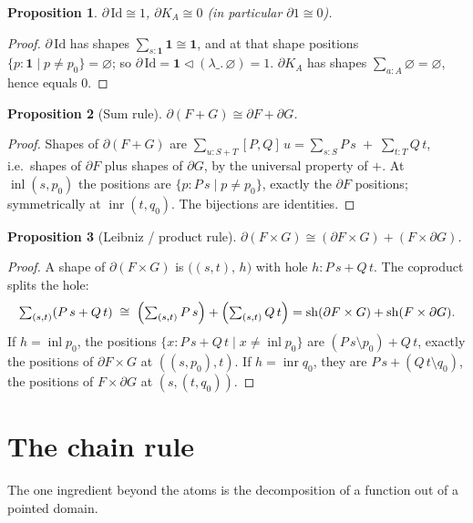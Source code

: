 \documentclass[11pt]{article}
\newtheorem{proposition}{Proposition}
\theoremstyle{definition}
\newcommand{\tri}{\mathbin{\triangleleft}}
\newcommand{\pd}{\partial}
\DeclareMathOperator{\inl}{inl}
\DeclareMathOperator{\inr}{inr}
\begin{document}
\begin{proposition}\label{prop:atoms}
$\pd\,\mathrm{Id} \cong 1$, \quad $\pd K_A \cong 0$ \; (in particular $\pd 1 \cong 0$).
\end{proposition}
\begin{proof}
$\pd\,\mathrm{Id}$ has shapes $\sum_{s:\mathbf 1}\mathbf 1 \cong \mathbf 1$, and at
that shape positions $\{p:\mathbf 1 \mid p\neq p_0\} = \varnothing$; so
$\pd\,\mathrm{Id} = \mathbf 1 \tri (\lambda\_.\,\varnothing) = 1$. $\pd K_A$ has
shapes $\sum_{a:A}\varnothing = \varnothing$, hence equals $0$.
\end{proof}

\begin{proposition}[Sum rule]\label{prop:sum}
$\pd(F + G) \cong \pd F + \pd G$.
\end{proposition}
\begin{proof}
Shapes of $\pd(F+G)$ are $\sum_{u : S+T}[P,Q]\,u = \sum_{s:S}P\,s \;+\; \sum_{t:T}Q\,t$,
i.e.\ shapes of $\pd F$ plus shapes of $\pd G$, by the universal property of $+$.
At $\inl(s,p_0)$ the positions are $\{p : P\,s \mid p\neq p_0\}$, exactly the
$\pd F$ positions; symmetrically at $\inr(t,q_0)$. The bijections are identities.
\end{proof}

\begin{proposition}[Leibniz / product rule]\label{prop:leibniz}
$\pd(F \times G) \cong (\pd F \times G) + (F \times \pd G)$.
\end{proposition}
\begin{proof}
A shape of $\pd(F\times G)$ is $\bigl((s,t),\,h\bigr)$ with hole
$h : P\,s + Q\,t$. The coproduct splits the hole:
\[
  \textstyle\sum_{(s,t)} (P\,s + Q\,t)
  \;\cong\; \Bigl(\sum_{(s,t)} P\,s\Bigr) + \Bigl(\sum_{(s,t)} Q\,t\Bigr)
  = \mathrm{sh}(\pd F\times G) + \mathrm{sh}(F\times\pd G).
\]
If $h = \inl p_0$, the positions $\{x : P\,s + Q\,t \mid x \neq \inl p_0\}$ are
$(P\,s \setminus p_0) + Q\,t$, exactly the positions of $\pd F \times G$ at
$((s,p_0),t)$. If $h = \inr q_0$, they are $P\,s + (Q\,t\setminus q_0)$, the
positions of $F \times \pd G$ at $(s,(t,q_0))$.
\end{proof}

\section{The chain rule}

The one ingredient beyond the atoms is the decomposition of a function out of a
pointed domain.
\end{document}
